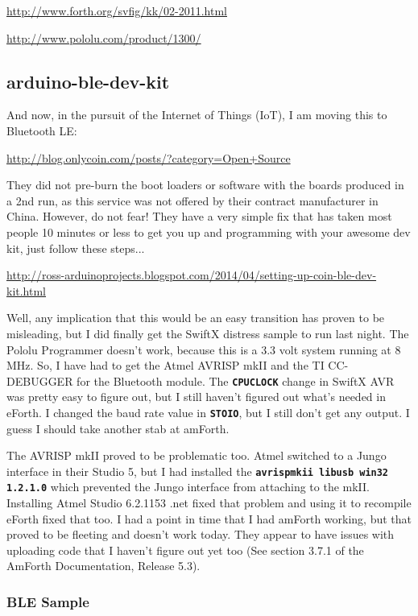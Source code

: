 \documentclass[10pt,english]{article}
\begin{document}
\url{http://www.forth.org/svfig/kk/02-2011.html}

\url{http://www.pololu.com/product/1300/}


\subsection{arduino-ble-dev-kit}

And now, in the pursuit of the Internet of Things (IoT), I am moving
this to Bluetooth LE:

\url{http://blog.onlycoin.com/posts/?category=Open+Source}

They did not pre-burn the boot loaders or software with the boards
produced in a 2nd run, as this service was not offered by their contract
manufacturer in China. However, do not fear! They have a very simple
fix that has taken most people 10 minutes or less to get you up and
programming with your awesome dev kit, just follow these steps...

\url{http://ross-arduinoprojects.blogspot.com/2014/04/setting-up-coin-ble-dev-kit.html}

Well, any implication that this would be an easy transition has proven
to be misleading, but I did finally get the SwiftX distress sample
to run last night. The Pololu Programmer doesn't work, because this
is a 3.3 volt system running at 8 MHz. So, I have had to get the Atmel
AVRISP mkII and the TI CC-DEBUGGER for the Bluetooth module. The \texttt{\textbf{CPUCLOCK}}
change in SwiftX AVR was pretty easy to figure out, but I still haven't
figured out what's needed in eForth. I changed the baud rate value
in \texttt{\textbf{STOIO}}, but I still don't get any output. I guess
I should take another stab at amForth.

The AVRISP mkII proved to be problematic too. Atmel switched to a
Jungo interface in their Studio 5, but I had installed the \texttt{\textbf{avrispmkii
libusb win32 1.2.1.0}} which prevented the Jungo interface from attaching
to the mkII. Installing Atmel Studio 6.2.1153 .net fixed that problem
and using it to recompile eForth fixed that too. I had a point in
time that I had amForth working, but that proved to be fleeting and
doesn't work today. They appear to have issues with uploading code
that I haven't figure out yet too (See section 3.7.1 of the AmForth
Documentation, Release 5.3).


\subsubsection{BLE Sample}
\end{document}

